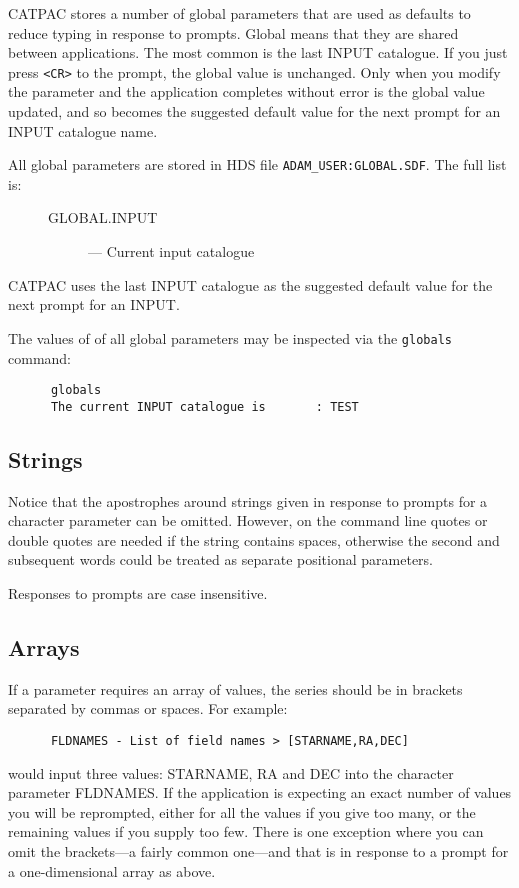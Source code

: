 {\small CATPAC} stores a number of global parameters that are used as defaults
to reduce typing in response to prompts. Global means that they are shared
between applications.  The most common is the last INPUT catalogue. If you just
press {\tt <CR>} to the prompt, the global value is unchanged. Only when you
modify the parameter and the  application completes without error is the global
value updated, and so becomes the suggested default value for the next prompt
for an INPUT catalogue name.

All global parameters are stored in HDS file {\tt ADAM\_USER:GLOBAL.SDF}.
The full list is:

\begin{description}
\item[\mbox{}]\mbox{}
\begin{description}
\item [GLOBAL.INPUT] --- Current input catalogue
\end{description}
\end{description}

{\small CATPAC} uses the last INPUT catalogue as the
suggested default value for the next prompt for an INPUT. 

The values of of all global parameters may be inspected via the
{\tt globals} command:
\begin{verbatim}
      globals
      The current INPUT catalogue is       : TEST
\end{verbatim}

\subsection{Strings}
\label{se:parstring}
Notice that the apostrophes around strings given in response to prompts
for a character parameter can be omitted. However, on the command
line quotes or double quotes are needed if the string contains spaces,
otherwise the second and subsequent words could be treated as
separate positional parameters.

Responses to prompts are case insensitive. 

\subsection{Arrays}
If a parameter requires an array of values, the series
should be in brackets separated by commas or spaces.  For example:
\begin{verbatim}
      FLDNAMES - List of field names > [STARNAME,RA,DEC]
\end{verbatim}
would input three values: STARNAME, RA and DEC into the character parameter
FLDNAMES.  If the application is expecting an exact number of values
you will be reprompted, either for all the values if you give too many,
or the remaining values if you supply too few.  There is one exception
where you can omit the brackets---a fairly common one---and that is in
response to a prompt for a one-dimensional array as above.

